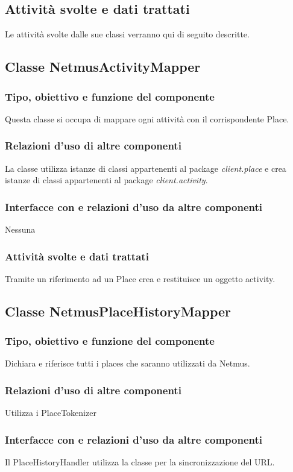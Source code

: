 \subsection*{Attivit\`a svolte e dati trattati}
Le attivit\`a svolte dalle sue classi verranno qui di seguito descritte.

\subsection{Classe NetmusActivityMapper}
\subsubsection*{Tipo, obiettivo e funzione del componente}
Questa classe si occupa di mappare ogni attivit\`a con il corrispondente Place.
\subsubsection*{Relazioni d'uso di altre componenti}
La classe utilizza istanze di classi appartenenti al package
\emph{client.place} e crea istanze di classi appartenenti al package
\emph{client.activity}.
\subsubsection*{Interfacce con e relazioni d'uso da altre
componenti} Nessuna
\subsubsection*{Attivit\`a svolte e dati trattati}
Tramite un riferimento ad un Place crea e restituisce un oggetto activity.

\subsection{Classe NetmusPlaceHistoryMapper}
\subsubsection*{Tipo, obiettivo e funzione del componente}
Dichiara e riferisce tutti i places che saranno utilizzati da Netmus.
\subsubsection*{Relazioni d'uso di altre componenti}
Utilizza i PlaceTokenizer
\subsubsection*{Interfacce con e relazioni d'uso da altre componenti}
Il PlaceHistoryHandler utilizza la classe per la sincronizzazione del URL.
